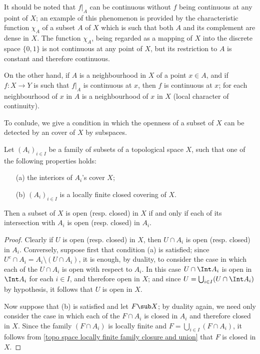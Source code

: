 It should be noted that $f|_A$ can be continuous without $f$ being continuous at any point of $X$; an example of this phenomenon is provided by the characteristic function $\chi_A$ of a subset $A$ of $X$ which is such that both $A$ and its complement are dense in $X$. The function $\chi_A$, being regarded as a mapping of $X$ into the discrete space $\{0,1\}$ is not continuous at any point of $X$, but its restriction to $A$ is constant and therefore continuous.\par
On the other hand, if $A$ is a neighbourhood in $X$ of a point $x\in A$, and if $f:X\to Y$ is such that $f|_A$ is continuous at $x$, then $f$ is continuous at $x$; for each neighbourhood of $x$ in $A$ is a neighbourhood of $x$ in $X$ (local character of continuity).\par
To conlude, we give a condition in which the openness of a subset of $X$ can be detected by an cover of $X$ by subspaces.
\begin{proposition}\label{topo space coproduct topology if}
Let $(A_i)_{i\in I}$ be a family of subsets of a topological space $X$, such that one of the following properties holds:
\begin{itemize}
\item[(a)] the interiors of $A_i$'s cover $X$;
\item[(b)] $(A_i)_{i\in I}$ is a locally finite closed covering of $X$.
\end{itemize}
Then a subset of $X$ is open (resp. closed) in $X$ if and only if each of its intersection with $A_i$ is open (resp. closed) in $A_i$.
\end{proposition}
\begin{proof}
Clearly if $U$ is open (resp. closed) in $X$, then $U\cap A_i$ is open (resp. closed) in $A_i$. Conversely, suppose first that condition (a) is satisfied; since $U^c\cap A_i=A_i\setminus(U\cap A_i)$, it is enough, by duality, to consider the case in which each of the $U\cap A_i$ is open with respect to $A_i$. In this case $U\cap\Int A_i$ is open in $\Int A_i$ for each $i\in I$, and therefore open in $X$; and since $U=\bigcup_{i\in I}(U\cap\Int A_i)$ by hypothesis, it follows that $U$ is open in $X$.\par
Now suppose that (b) is satisfied and let $F\sub X$; by duality again, we need only consider the case in which each of the $F\cap A_i$ is closed in $A_i$ and therefore closed in $X$. Since the family $(F\cap A_i)$ is locally finite and $F=\bigcup_{i\in I}(F\cap A_i)$, it follows from \cref{topo space locally finite family closure and union} that $F$ is closed in $X$.
\end{proof}
